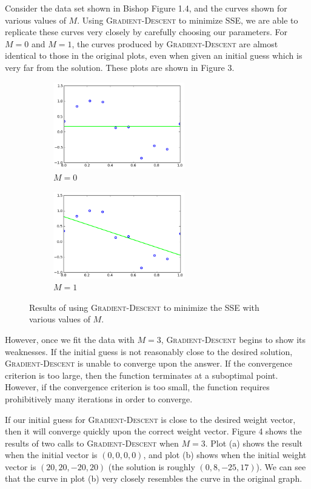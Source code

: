 \documentclass{sigchi}
\begin{document}
Consider the data set shown in Bishop Figure 1.4, and the curves shown for various values of $M$. Using \textsc{Gradient-Descent} to minimize SSE, we are able to replicate these curves very closely by carefully choosing our parameters. For $M = 0$ and $M = 1$, the curves produced by \textsc{Gradient-Descent} are almost identical to those in the original plots, even when given an initial guess which is very far from the solution. These plots are shown in Figure 3.

\begin{figure}[!t]
\centering
\begin{subfigure}[b]{2.25in}
	\includegraphics[width = 2.25in]{m0.png}
	\caption{$M = 0$}
\end{subfigure}
\begin{subfigure}[b]{2.25in}
	\includegraphics[width = 2.25in]{m1.png}
	\caption{$M = 1$}
\end{subfigure}
\caption{Results of using \textsc{Gradient-Descent} to minimize the SSE with various values of $M$.}
\end{figure}

However, once we fit the data with $M = 3$, \textsc{Gradient-Descent} begins to show its weaknesses. If the initial guess is not reasonably close to the desired solution, \textsc{Gradient-Descent} is unable to converge upon the answer. If the convergence criterion is too large, then the function terminates at a suboptimal point. However, if the convergence criterion is too small, the function requires prohibitively many iterations in order to converge.

If our initial guess for \textsc{Gradient-Descent} is close to the desired weight vector, then it will converge quickly upon the correct weight vector. Figure 4 shows the results of two calls to \textsc{Gradient-Descent} when $M = 3$. Plot (a) shows the result when the initial vector is $(0, 0, 0, 0)$, and plot (b) shows when the initial weight vector is $(20, 20, -20, 20)$ (the solution is roughly $(0, 8, -25, 17)$). We can see that the curve in plot (b) very closely resembles the curve in the original graph.
\end{document}
